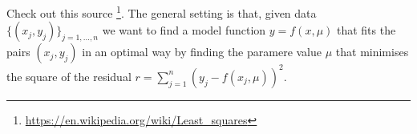 \documentclass[dvipsnames, table, 11pt]{article}
\begin{document}
Check out this source \footnote{\url{https://en.wikipedia.org/wiki/Least_squares}}.
The general setting is that, given data $\{(x_{j},y_{j})\}_{j=1,\dots,n}$ we want to find a model function $y=f(x,\mu)$ that fits the pairs $(x_{j},y_{j})$ in an optimal way by finding the paramere value $\mu$ that minimises the square of the residual $r = \sum_{j=1}^{n}(y_{j}-f(x_{j},\mu))^2$.


\end{document}
